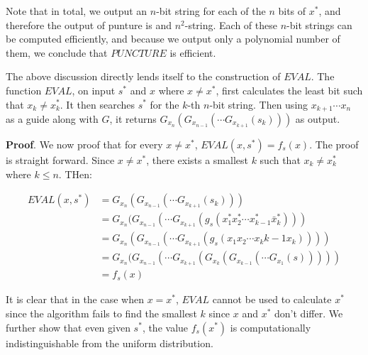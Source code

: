 \documentclass{article}
\begin{document}
\begin{enumerate}
\begin{enumerate}[,label=\alph*.]
Note that in total, we output an $n$-bit string for each of the $n$ bits of $x^*$, and therefore the 
output of punture is and $n^2$-string. Each of these $n$-bit strings can be computed efficiently,
and because we output only a polynomial number of them, we conclude that $PUNCTURE$ is efficient.%

The above discussion directly lends itself to the construction of $EVAL$. The function $EVAL$, 
on input $s^*$ and $x$ where $x \neq x^*$, first calculates the least bit such that $x_k \neq x_k^*$.
It then searches $s^*$ for the $k$-th $n$-bit string. Then using $x_{k+1}\cdots x_{n}$ as a guide
along with $G$, it returns $G_{x_n}(G_{x_{n-1}}(\cdots G_{x_{k+1}}(s_k)))$ as output.%

\begin{mdbmarginx}{1ex}{0pt}{1ex}{0pt}%
\noindent{}\textbf{Proof}.  We now proof that for every $x \neq x^*$, $EVAL(x,s^*) = f_s(x)$. The proof is straight forward.
Since $x \neq x^*$, there exists a smallest $k$ such that $x_k \neq x_k^*$ where $k \leq n$. THen:%
\end{mdbmarginx}%
\noindent\noindent\[%
\begin{aligned}
EVAL(x,s^*) &= G_{x_{n}}(G_{x_{n-1}}(\cdots G_{x_{k+1}}(s_k))) \\
&= G_{x_{n}}(G_{x_{n-1}}(\cdots G_{x_{k+1}}(g_s(x_1^*x_2^*\cdots x_{k-1}^*\bar{x}_k^*))) \\
&= G_{x_{n}}(G_{x_{n-1}}(\cdots G_{x_{k+1}}(g_s(x_1x_2\cdots x_k{k-1}x_{k})))) \\
&= G_{x_{n}}(G_{x_{n-1}}(\cdots G_{x_{k+1}}(G_{x_k}(G_{x_{k-1}}(\cdots G_{x_1}(s))))) \\
&= f_s(x)
\end{aligned}
\]%

It is clear that in the case when $x = x^*$, $EVAL$ cannot be used to calculate $x^*$ since the 
algorithm fails to find the smallest $k$ since $x$ and
$x^*$ don't differ. 
We further show that even given $s^*$, the value $f_s(x^*)$ is computationally indistinguishable
from the uniform distribution.%


\end{enumerate}
\end{enumerate}
\end{document}
